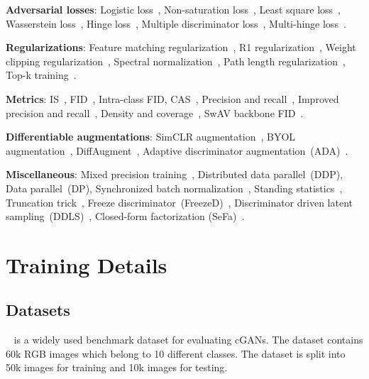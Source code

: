 \documentclass{article}
\begin{document}
\textbf{Adversarial losses}: Logistic loss~\cite{karras2020analyzing}, Non-saturation loss~\cite{Goodfellow2014GenerativeAN}, Least square loss~\cite{Mao2017LeastSG}, Wasserstein loss~\cite{Arjovsky2017WassersteinG}, Hinge loss~\cite{Lim2017GeometricG}, Multiple discriminator loss~\cite{Liu_2019_ICCV}, Multi-hinge loss~\cite{kavalerov2021multi}.

\textbf{Regularizations}: Feature matching regularization~\cite{Salimans2016ImprovedTF}, R1 regularization~\cite{Liu_2019_ICCV}, Weight clipping regularization~\cite{Arjovsky2017WassersteinG}, Spectral normalization~\cite{Miyato2018SpectralNF}, Path length regularization~\cite{karras2019style, karras2020analyzing}, Top-k training~\cite{Sinha2020TopkTO}.

\textbf{Metrics}: IS~\cite{Salimans2016ImprovedTF}, FID~\cite{Heusel2017GANsTB}, Intra-class FID, CAS~\cite{Ravuri2019ClassificationAS}, Precision and recall~\cite{sajjadi2018assessing}, Improved precision and recall~\cite{Kynknniemi2019ImprovedPA}, Density and coverage~\cite{ferjad2020icml}, SwAV backbone FID~\cite{Morozov2021OnSI}.

\textbf{Differentiable augmentations}: SimCLR augmentation~\cite{Chen2020ASF, jeong2021training}, BYOL augmentation~\cite{grill2020bootstrap, jeong2021training}, DiffAugment~\cite{zhao2020differentiable}, Adaptive discriminator augmentation~(ADA)~\cite{Karras2020TrainingGA}.

\textbf{Miscellaneous}: Mixed precision training~\cite{micikevicius2018mixed}, Distributed data parallel~(DDP), Data parallel~(DP), Synchronized batch normalization~\cite{pmlr-v37-ioffe15}, Standing statistics~\cite{Brock2019LargeSG}, Truncation trick~\cite{Brock2019LargeSG, karras2020analyzing}, Freeze discriminator~(FreezeD)~\cite{mo2020freeze}, Discriminator driven latent sampling~(DDLS)~\cite{che2020your}, Closed-form factorization (SeFa)~\cite{shen2021closedform}. \section{Training Details}
\subsection{\large{Datasets}}
\label{dataset}
\textbf{}~\cite{Krizhevsky2009LearningML} is a widely used benchmark dataset for evaluating cGANs. The dataset contains 60k  RGB images which belong to 10 different classes. The dataset is split into 50k images for training and 10k images for testing.
\end{document}
